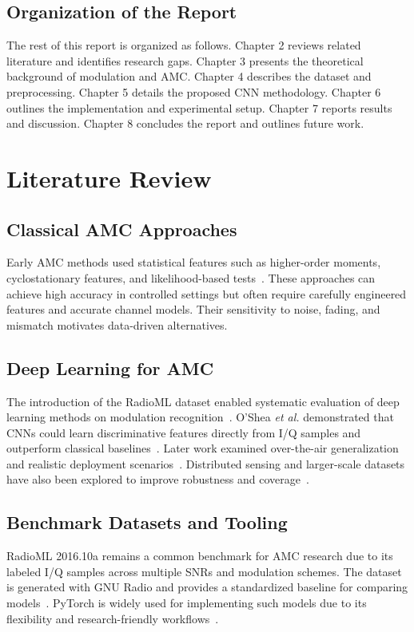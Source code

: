 \documentclass[12pt,a4paper]{report}
\begin{document}
\section{Organization of the Report}
The rest of this report is organized as follows. Chapter 2 reviews related literature and identifies research gaps. Chapter 3 presents the theoretical background of modulation and AMC. Chapter 4 describes the dataset and preprocessing. Chapter 5 details the proposed CNN methodology. Chapter 6 outlines the implementation and experimental setup. Chapter 7 reports results and discussion. Chapter 8 concludes the report and outlines future work.

\chapter{Literature Review}
\section{Classical AMC Approaches}
Early AMC methods used statistical features such as higher-order moments, cyclostationary features, and likelihood-based tests~\cite{azzouznandi1996,gardner1988}. These approaches can achieve high accuracy in controlled settings but often require carefully engineered features and accurate channel models. Their sensitivity to noise, fading, and mismatch motivates data-driven alternatives.

\section{Deep Learning for AMC}
The introduction of the RadioML dataset enabled systematic evaluation of deep learning methods on modulation recognition~\cite{oshea2016dataset}. O’Shea \textit{et al.} demonstrated that CNNs could learn discriminative features directly from I/Q samples and outperform classical baselines~\cite{oshea2016cnn}. Later work examined over-the-air generalization and realistic deployment scenarios~\cite{oshea2018ota}. Distributed sensing and larger-scale datasets have also been explored to improve robustness and coverage~\cite{rajendran2018dl}.

\section{Benchmark Datasets and Tooling}
RadioML 2016.10a remains a common benchmark for AMC research due to its labeled I/Q samples across multiple SNRs and modulation schemes. The dataset is generated with GNU Radio and provides a standardized baseline for comparing models~\cite{oshea2016dataset}. PyTorch is widely used for implementing such models due to its flexibility and research-friendly workflows~\cite{pytorchdocs}.
\end{document}
